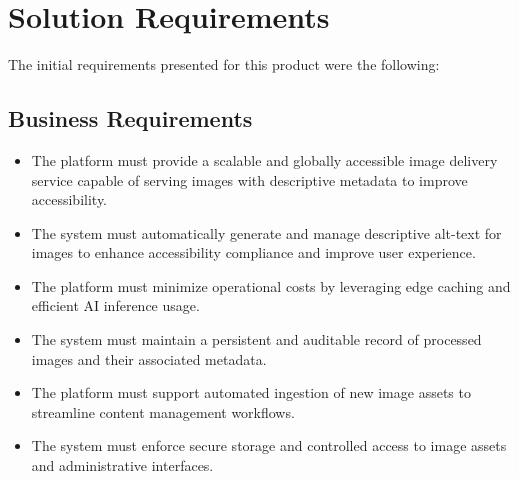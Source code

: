 \documentclass[12pt]{article}
\begin{document}
\pagebreak


\section{Solution Requirements}
The initial requirements presented for this product were the following:

\subsection{Business Requirements}
\begin{itemize}[leftmargin=*]
  \item The platform must provide a scalable and globally accessible image delivery service capable of serving images with descriptive metadata to improve accessibility.
  \item The system must automatically generate and manage descriptive alt-text for images to enhance accessibility compliance and improve user experience.
  \item The platform must minimize operational costs by leveraging edge caching and efficient AI inference usage.
  \item The system must maintain a persistent and auditable record of processed images and their associated metadata.
  \item The platform must support automated ingestion of new image assets to streamline content management workflows.
  \item The system must enforce secure storage and controlled access to image assets and administrative interfaces.
\end{itemize}
\end{document}
